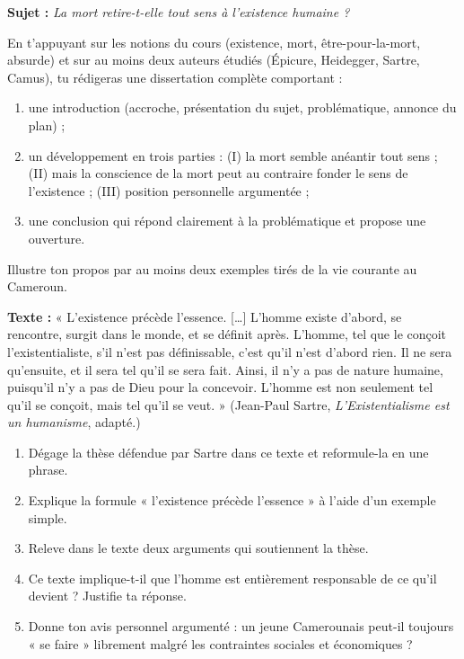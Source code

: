\documentclass[11pt]{article}
\begin{document}
\begin{exercice}
\textbf{Sujet :} \emph{La mort retire-t-elle tout sens à l'existence humaine ?}

En t'appuyant sur les notions du cours (existence, mort, être-pour-la-mort, absurde) et sur au moins deux auteurs étudiés (Épicure, Heidegger, Sartre, Camus), tu rédigeras une dissertation complète comportant :
\begin{enumerate}
\item une introduction (accroche, présentation du sujet, problématique, annonce du plan) ;
\item un développement en trois parties : (I) la mort semble anéantir tout sens ; (II) mais la conscience de la mort peut au contraire fonder le sens de l'existence ; (III) position personnelle argumentée ;
\item une conclusion qui répond clairement à la problématique et propose une ouverture.
\end{enumerate}
Illustre ton propos par au moins deux exemples tirés de la vie courante au Cameroun.
\end{exercice}

\begin{exercice}
\textbf{Texte :} « L'existence précède l'essence. [\ldots] L'homme existe d'abord, se rencontre, surgit dans le monde, et se définit après. L'homme, tel que le conçoit l'existentialiste, s'il n'est pas définissable, c'est qu'il n'est d'abord rien. Il ne sera qu'ensuite, et il sera tel qu'il se sera fait. Ainsi, il n'y a pas de nature humaine, puisqu'il n'y a pas de Dieu pour la concevoir. L'homme est non seulement tel qu'il se conçoit, mais tel qu'il se veut. » (Jean-Paul Sartre, \emph{L'Existentialisme est un humanisme}, adapté.)

\begin{enumerate}
\item Dégage la thèse défendue par Sartre dans ce texte et reformule-la en une phrase.
\item Explique la formule « l'existence précède l'essence » à l'aide d'un exemple simple.
\item Releve dans le texte deux arguments qui soutiennent la thèse.
\item Ce texte implique-t-il que l'homme est entièrement responsable de ce qu'il devient ? Justifie ta réponse.
\item Donne ton avis personnel argumenté : un jeune Camerounais peut-il toujours « se faire » librement malgré les contraintes sociales et économiques ?
\end{enumerate}
\end{exercice}
\end{document}
